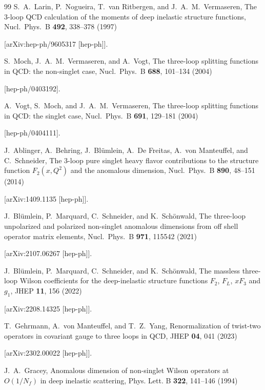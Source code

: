 \documentclass[
 twocolumn,
 superscriptaddress,
 preprintnumbers,
 nofootinbib,
 amsmath,amssymb,
 aps,
 prl
 ]{revtex4-2}
\begin{document}
\begin{thebibliography}{99}
S.~A.~Larin, P.~Nogueira, T.~van Ritbergen, and J.~A.~M.~Vermaseren,
The 3-loop QCD calculation of the moments of deep inelastic structure functions,
Nucl.\ Phys.\ B \textbf{492}, 338--378 (1997)

[arXiv:hep-ph/9605317 [hep-ph]].



S.~Moch, J.~A.~M.~Vermaseren, and A.~Vogt,
The three-loop splitting functions in QCD: the non-singlet case,
Nucl.\ Phys.\ B {\bf 688}, 101--134 (2004)

[hep-ph/0403192].




A.~Vogt, S.~Moch, and J.~A.~M.~Vermaseren,
The three-loop splitting functions in QCD: the singlet case,
Nucl.\ Phys.\ B {\bf 691}, 129--181 (2004)

[hep-ph/0404111].




J.~Ablinger, A.~Behring, J.~Bl{\"u}mlein, A.~De Freitas, A.~von Manteuffel, and C.~Schneider,
The 3-loop pure singlet heavy flavor contributions to the structure function $F_2(x,Q^2)$ and the anomalous dimension,
Nucl.\ Phys.\ B \textbf{890}, 48--151 (2014)

[arXiv:1409.1135 [hep-ph]].



J.~Bl{\"u}mlein, P.~Marquard, C.~Schneider, and K.~Sch{\"o}nwald,
The three-loop unpolarized and polarized non-singlet anomalous dimensions from off shell operator matrix elements,
Nucl.\ Phys.\ B \textbf{971}, 115542 (2021)

[arXiv:2107.06267 [hep-ph]].



J.~Bl{\"u}mlein, P.~Marquard, C.~Schneider, and K.~Sch{\"o}nwald,
The massless three-loop Wilson coefficients for the deep-inelastic structure functions $F_{2}$, $F_{L}$, $xF_{3}$ and $g_{1}$,
JHEP \textbf{11}, 156 (2022)

[arXiv:2208.14325 [hep-ph]].



T.~Gehrmann, A.~von Manteuffel, and T.~Z.~Yang,
Renormalization of twist-two operators in covariant gauge to three loops in QCD,
JHEP \textbf{04}, 041 (2023)

[arXiv:2302.00022 [hep-ph]].



J.~A.~Gracey,
Anomalous dimension of non-singlet Wilson operators at $O(1 / N_f)$ in deep inelastic scattering,
Phys. Lett. B \textbf{322}, 141--146 (1994)


\end{thebibliography}
\end{document}
